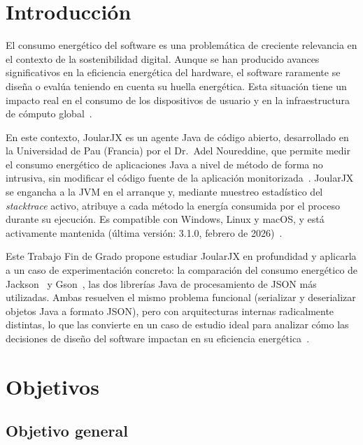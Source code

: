 \documentclass[11pt,a4paper,oneside]{article}
\begin{document}

\section{Introducción}
\label{sec:introduccion}

El consumo energético del software es una problemática de creciente
relevancia en el contexto de la sostenibilidad digital. Aunque se han
producido avances significativos en la eficiencia energética del
hardware, el software raramente se diseña o evalúa teniendo en cuenta su
huella energética. Esta situación tiene un impacto real en el consumo de
los dispositivos de usuario y en la infraestructura de cómputo
global~\cite{verdecchia2021}.

En este contexto, JoularJX es un agente Java de código abierto,
desarrollado en la Universidad de Pau (Francia) por el Dr.~Adel
Noureddine, que permite medir el consumo energético de aplicaciones Java
a nivel de método de forma no intrusiva, sin modificar el código fuente
de la aplicación monitorizada~\cite{joularjx2022}. JoularJX se engancha a
la JVM en el arranque y, mediante muestreo estadístico del
\textit{stacktrace} activo, atribuye a cada método la energía consumida
por el proceso durante su ejecución. Es compatible con Windows, Linux y
macOS, y está activamente mantenida (última versión: 3.1.0, febrero de
2026)~\cite{joularjx3}.

Este Trabajo Fin de Grado propone estudiar JoularJX en profundidad y
aplicarla a un caso de experimentación concreto: la comparación del
consumo energético de Jackson~\cite{jackson} y Gson~\cite{gson}, las dos
librerías Java de procesamiento de JSON más utilizadas. Ambas resuelven
el mismo problema funcional (serializar y deserializar objetos Java a
formato JSON), pero con arquitecturas internas radicalmente distintas,
lo que las convierte en un caso de estudio ideal para analizar cómo las
decisiones de diseño del software impactan en su eficiencia
energética~\cite{noureddine2025}.


\section{Objetivos}
\label{sec:objetivos-y-campo}

\subsection*{Objetivo general}
\end{document}
